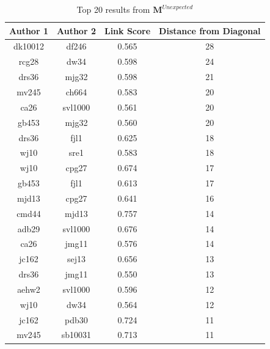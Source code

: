 \begin{table}[H]
\centering
\caption{Top 20 results from $\mathbf{M}^{Unexpected}$}
\label{tab:unexp}
\begin{tabular}{||c|c|c|c||}
\hline
Author 1 & Author 2 & Link Score & Distance from Diagonal\\
\hline
dk10012 & df246 & 0.565 & 28 \\ 
rcg28 & dw34 & 0.598 & 24 \\ 
drs36 & mjg32 & 0.598 & 21 \\ 
mv245 & ch664 & 0.583 & 20 \\
ca26 & svl1000 & 0.561 & 20 \\ 
gb453 & mjg32 & 0.560 & 20 \\ 
drs36 & fjl1 & 0.625 & 18 \\ 
wj10 & sre1 & 0.583 & 18 \\ 
wj10 & cpg27 & 0.674 & 17 \\ 
gb453 & fjl1 & 0.613 & 17 \\ 
mjd13 & cpg27 & 0.641 & 16 \\ 
cmd44 & mjd13 & 0.757 & 14 \\
adb29 & svl1000 & 0.676 & 14 \\ 
ca26 & jmg11 & 0.576 & 14 \\ 
jc162 & sej13 & 0.656 & 13 \\ 
drs36 & jmg11 & 0.550 & 13 \\
aehw2 & svl1000 & 0.596 & 12 \\ 
wj10 & dw34 & 0.564 & 12 \\ 
jc162 & pdb30 & 0.724 & 11 \\ 
mv245 & sb10031 & 0.713 & 11 \\ 
\hline
\end{tabular}
\end{table}
\newpage

